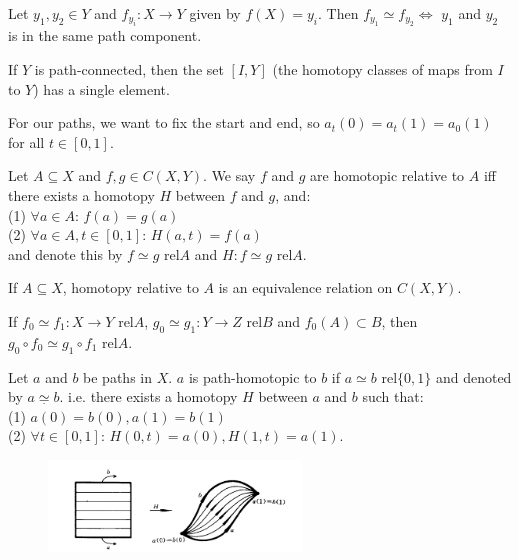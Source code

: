 \begin{proposition}{}{}
    Let $y_1,y_2\in Y$ and $f_{y_i}:X\rightarrow Y$ given by $f(X)=y_i$.
    Then $f_{y_1}\simeq f_{y_2}\Leftrightarrow$ $y_1$ and $y_2$ is in the same path component.
\end{proposition}


\begin{proposition}{}{}
    If $Y$ is path-connected, then the set $[I,Y]$ 
    (the homotopy classes of maps from $I$ to $Y$) 
    has a single element.
\end{proposition}


For our paths, we want to fix the start and end, so $a_t(0) = a_t(1) = a_0(1)$ for all $t \in [0, 1]$.

\begin{definition}{}{}
    Let $A\subseteq X$ and $f,g\in C(X,Y)$.
    We say $f$ and $g$ are homotopic relative to $A$ iff there exists a homotopy $H$ between $f$ and $g$, and:\\
    (1) $\forall a\in A$: $f(a)=g(a)$\\
    (2) $\forall a\in A, t\in [0,1]$: $H(a,t)=f(a)$\\
    and denote this by $f\simeq g \text{ rel}A$ and $H:f\simeq g\text{ rel}A$.
\end{definition}

\begin{proposition}{}{}
    If $A\subseteq X$, homotopy relative to $A$ is an equivalence relation on $C(X, Y)$.
\end{proposition}

\begin{proposition}{}{}
    If $f_0\simeq f_1: X\rightarrow Y \text{ rel}A$,
    $g_0\simeq g_1:Y\rightarrow Z\text{ rel}B$ and $f_0(A)\subset B$, then
    $g_0\circ f_0\simeq g_1\circ f_1 \text{ rel}A$.
\end{proposition}

\begin{definition}{}{}
    Let $a$ and $b$ be paths in $X$. $a$ is path-homotopic to $b$ if $a\simeq b \text{ rel}\{0,1\}$
    and denoted by $a \underset{\cdot}{\simeq} b$. i.e.
    there exists a homotopy $H$ between $a$ and $b$ such that:\\
    (1) $a(0)=b(0),a(1)=b(1)$\\
    (2) $\forall t\in [0,1]$: $H(0,t)=a(0), H(1,t)=a(1)$.
\end{definition}

\begin{figure}[H]
    \centering
    \includegraphics[width=0.6\textwidth]{figure/path-homotopic.png}
    \caption{}
\end{figure}

